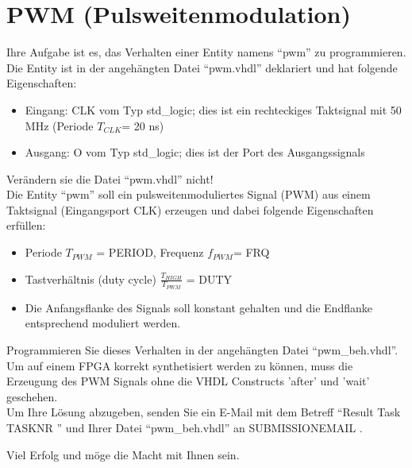 \documentclass[a4paper,12pt]{article}
\begin{document}
\pagestyle{empty}
\setlength{\parindent}{0em}
\section*{PWM (Pulsweitenmodulation)}

Ihre Aufgabe ist es, das Verhalten einer Entity  namens "`pwm"' zu programmieren. Die Entity ist in der angeh\"angten Datei "`pwm.vhdl"' deklariert und hat folgende Eigenschaften:

\begin{itemize}
\item Eingang:  CLK vom Typ std\_logic; dies ist ein rechteckiges Taktsignal mit 50 MHz (Periode $T_{CLK}$= 20 ns)
\item Ausgang: O vom Typ std\_logic; dies ist der Port des Ausgangssignals
\end{itemize}
\begin{center}
\end{center}

Ver\"andern sie die Datei "`pwm.vhdl"' nicht!\\

Die Entity "`pwm"' soll ein pulsweitenmoduliertes Signal (PWM) aus einem Taktsignal (Eingangsport CLK) erzeugen und dabei folgende Eigenschaften erf\"ullen:
\begin{itemize}
\item Periode $T_{PWM}$ = {{PERIOD}}, Frequenz $f_{PWM}$= {{FRQ}}
\item Tastverh\"altnis (duty cycle)  $\frac{T_{HIGH}}{T_{PWM}}$ = {{DUTY}}
\item Die Anfangsflanke des Signals soll konstant gehalten und die Endflanke entsprechend moduliert werden.
\end{itemize}
\vspace{0.3cm}

Programmieren Sie dieses Verhalten in der angeh\"angten Datei "`pwm\_beh.vhdl"'.
\\

Um auf einem FPGA korrekt synthetisiert werden zu k\"onnen, muss die Erzeugung des PWM Signals ohne die VHDL Constructs 'after' und 'wait' geschehen.
\\

Um Ihre L\"osung abzugeben, senden Sie ein E-Mail mit dem Betreff "`Result Task {{ TASKNR }}"' und Ihrer Datei "`pwm\_beh.vhdl"'  an {{ SUBMISSIONEMAIL }}.

\vspace{0.7cm}

Viel Erfolg und m\"oge die Macht mit Ihnen sein.
\end{document}
